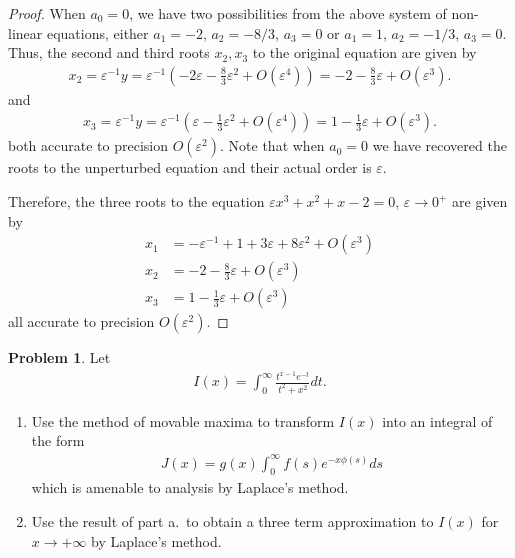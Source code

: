 \documentclass[12pt]{article}
\theoremstyle{definition}
\newtheorem{problem}{Problem}
\begin{document}
\begin{proof}
  When $a_0 = 0$, we have two possibilities from the above system of non-linear equations, either
  $a_1 = -2$, $a_2 = -8/3$, $a_3 = 0$ or $a_1=1$, $a_2 = -1/3$, $a_3 = 0$.
  Thus, the second and third roots $x_2, x_3$ to the original equation are given by
  \begin{align*}
    x_2 = \varepsilon^{-1}y = \varepsilon^{-1}\left(-2\varepsilon -\frac{8}{3} \varepsilon^2  + O(\varepsilon^4)\right) = -2 -\frac{8}{3} \varepsilon  + O(\varepsilon^3).
  \end{align*}
  and
  \begin{align*}
    x_3 = \varepsilon^{-1}y = \varepsilon^{-1}\left(\varepsilon -\frac{1}{3} \varepsilon^2  + O(\varepsilon^4)\right) = 1 -\frac{1}{3} \varepsilon  + O(\varepsilon^3).
  \end{align*}
  both accurate to precision $O(\varepsilon^2)$. Note that when $a_0 =0$ we have recovered the roots to the unperturbed equation and their actual order is $\varepsilon$.

  Therefore, the three roots to the equation $\varepsilon x^3 + x^2 +x - 2 = 0$, $\varepsilon \to 0^+$ are given by
  \begin{align*}
    x_1 &= -\varepsilon^{-1} + 1 + 3 \varepsilon + 8 \varepsilon^2 + O(\varepsilon^3) \\
    x_2 &= -2 -\frac{8}{3} \varepsilon  + O(\varepsilon^3) \\
    x_3 &= 1 -\frac{1}{3} \varepsilon  + O(\varepsilon^3)
  \end{align*}
  all accurate to precision $O(\varepsilon^2)$.
\end{proof}
\newpage


\begin{problem}
  Let
  \begin{align*}
    I(x) = \int_0^\infty \frac{t^{x-1}e^{-t}}{t^2+x^2} dt.
  \end{align*}

  \begin{enumerate}
    \item Use the method of movable maxima to transform $I(x)$ into an integral
      of the form
      \begin{align*}
        J(x) = g(x) \int_{0}^\infty f(s) e^{-x\phi(s)} ds
      \end{align*}
      which is amenable to analysis by Laplace's method.
    \item Use the result of part a.\ to obtain a three term approximation to $I(x)$ for
      $x\to +\infty$ by Laplace's method.
  \end{enumerate}
\end{problem}
\end{document}
